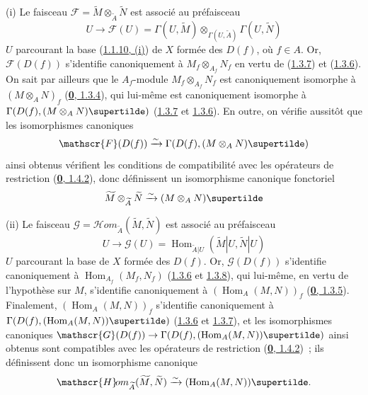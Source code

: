 (i) Le faisceau
$\mathscr{F}=\widetilde{M}\otimes_{\widetilde{A}}\widetilde{N}$ est associé
au préfaisceau
\[
  U\to\mathscr{F}(U)=\Gamma(U,\widetilde{M})
  \otimes_{\Gamma(U,\widetilde{A})}\Gamma(U,\widetilde{N})
\]
$U$ parcourant la base (\hyperref[I.1.1.10-fr]{1.1.10, (i)}) de $X$ formée
des $D(f)$, où $f\in A$. Or, $\mathscr{F}(D(f))$ s'identifie canoniquement à
$M_f\otimes_{A_f}N_f$ en vertu de (\hyperref[I.1.3.7-fr]{1.3.7}) et
(\hyperref[I.1.3.6-fr]{1.3.6}). On sait par ailleurs que le $A_f$-module
$M_f\otimes_{A_f}N_f$ est canoniquement isomorphe à $(M\otimes_A N)_f$
(\hyperref[0.1.3.4-fr]{\textbf{0}, 1.3.4}), qui lui-même est canoniquement isomorphe à
$\Gamma(D(f),(M\otimes_A N)\supertilde)$
(\hyperref[I.1.3.7-fr]{1.3.7} et \hyperref[I.1.3.6-fr]{1.3.6}). En outre, on
vérifie aussitôt que les isomorphismes canoniques
\[
  \mathscr{F}(D(f))\xrightarrow{\sim}\Gamma(D(f),(M\otimes_A N)\supertilde)
\]
ainsi obtenus vérifient les conditions de compatibilité avec les opérateurs de
restriction (\hyperref[0.1.4.2-fr]{\textbf{0}, 1.4.2}), donc définissent un isomorphisme
canonique fonctoriel
\[
  \widetilde{M}\otimes_{\widetilde{A}}\widetilde{N}
  \xrightarrow{\sim}(M\otimes_A N)\supertilde
\]

(ii) Le faisceau
$\mathscr{G}=\mathscr{H}\!om_{\widetilde{A}}(\widetilde{M},\widetilde{N})$
est associé au préfaisceau
\[
  U\longrightarrow\mathscr{G}(U)
  =\operatorname{Hom}_{\widetilde{A}|U}
  (\widetilde{M}|U,\widetilde{N}|U)
\]
$U$ parcourant la base de $X$ formée des $D(f)$. Or,
$\mathscr{G}(D(f))$ s'identifie canoniquement à
$\operatorname{Hom}_{A_f}(M_f,N_f)$
(\hyperref[I.1.3.6-fr]{1.3.6} et \hyperref[I.1.3.8-fr]{1.3.8}), qui
lui-même, en vertu de l'hypothèse sur $M$, s'identifie canoniquement à
$(\operatorname{Hom}_A(M,N))_f$
(\hyperref[0.1.3.5-fr]{\textbf{0}, 1.3.5}). Finalement,
$(\operatorname{Hom}_A(M,N))_f$ s'identifie canoniquement à
$\Gamma(D(f),(\operatorname{Hom}_A(M,N))\supertilde)$
(\hyperref[I.1.3.6-fr]{1.3.6} et \hyperref[I.1.3.7-fr]{1.3.7}), et les
isomorphismes canoniques
$\mathscr{G}(D(f))\to
\Gamma(D(f),(\operatorname{Hom}_A(M,N))\supertilde)$ ainsi obtenus sont
compatibles avec les opérateurs de restriction
(\hyperref[0.1.4.2-fr]{\textbf{0}, 1.4.2})~; ils définissent donc un isomorphisme
canonique
\[
  \mathscr{H}\!om_{\widetilde{A}}(\widetilde{M},\widetilde{N})
  \xrightarrow{\sim}(\operatorname{Hom}_A(M,N))\supertilde.
\]

